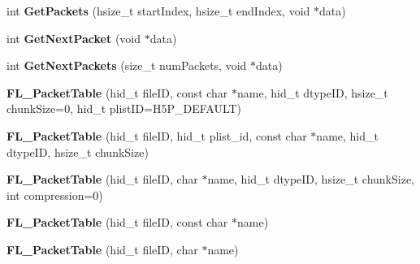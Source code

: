\begin{DoxyCompactItemize}
\item 
\mbox{\label{class_f_l___packet_table_ad2014dca0fc515832b753fcc0451a375}} 
int {\bfseries Get\+Packets} (hsize\+\_\+t start\+Index, hsize\+\_\+t end\+Index, void $\ast$data)
\item 
\mbox{\label{class_f_l___packet_table_ab626730cc9e44f44160ce31af3b714aa}} 
int {\bfseries Get\+Next\+Packet} (void $\ast$data)
\item 
\mbox{\label{class_f_l___packet_table_ad4467800cdc82cf554dca12b8bc87db7}} 
int {\bfseries Get\+Next\+Packets} (size\+\_\+t num\+Packets, void $\ast$data)
\item 
\mbox{\label{class_f_l___packet_table_a7d6e02d504f137abaa2e67b010ea9ba1}} 
{\bfseries F\+L\+\_\+\+Packet\+Table} (hid\+\_\+t file\+ID, const char $\ast$name, hid\+\_\+t dtype\+ID, hsize\+\_\+t chunk\+Size=0, hid\+\_\+t plist\+ID=H5\+P\+\_\+\+D\+E\+F\+A\+U\+LT)
\item 
\mbox{\label{class_f_l___packet_table_a0b0cde13ce7c6257b49eb1b38b03fd74}} 
{\bfseries F\+L\+\_\+\+Packet\+Table} (hid\+\_\+t file\+ID, hid\+\_\+t plist\+\_\+id, const char $\ast$name, hid\+\_\+t dtype\+ID, hsize\+\_\+t chunk\+Size)
\item 
\mbox{\label{class_f_l___packet_table_a9ce095ec7f8da87827559e6727bf933c}} 
{\bfseries F\+L\+\_\+\+Packet\+Table} (hid\+\_\+t file\+ID, char $\ast$name, hid\+\_\+t dtype\+ID, hsize\+\_\+t chunk\+Size, int compression=0)
\item 
\mbox{\label{class_f_l___packet_table_ae331cd0a76790556cd516eaa1076e6ff}} 
{\bfseries F\+L\+\_\+\+Packet\+Table} (hid\+\_\+t file\+ID, const char $\ast$name)
\item 
\mbox{\label{class_f_l___packet_table_a6af5d6b31eefde146fe25789e53a2c4c}} 
{\bfseries F\+L\+\_\+\+Packet\+Table} (hid\+\_\+t file\+ID, char $\ast$name)
\item 
\mbox{\label{class_f_l___packet_table_ad85d606ad528cefe7933defbfce89309}} 

\end{DoxyCompactItemize}

